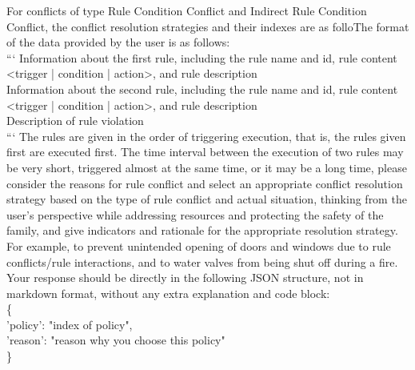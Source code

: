 {	For conflicts of type Rule Condition Conflict and Indirect Rule Condition Conflict, the conflict resolution strategies and their indexes are as folloThe format of the data provided by the user is as follows:\\
	```
	Information about the first rule, including the rule name and id, rule content <trigger | condition | action>, and rule description\\
	Information about the second rule, including the rule name and id, rule content <trigger | condition | action>, and rule description\\
	Description of rule violation\\
	```
	The rules are given in the order of triggering execution, that is, the rules given first are executed first. The time interval between the execution of two rules may be very short, triggered almost at the same time, or it may be a long time, please consider the reasons for rule conflict and select an appropriate conflict resolution strategy based on the type of rule conflict and actual situation, thinking from the user's perspective while addressing resources and protecting the safety of the family, and give indicators and rationale for the appropriate resolution strategy.
	For example, to prevent unintended opening of doors and windows due to rule conflicts/rule interactions, and to water valves from being shut off during a fire.\\
	Your response should be directly in the following JSON structure, not in markdown format, without any extra explanation and code block:\\
	\{\\
	'policy': "index of policy",\\
	'reason': "reason why you choose this policy"\\
	\}
}

